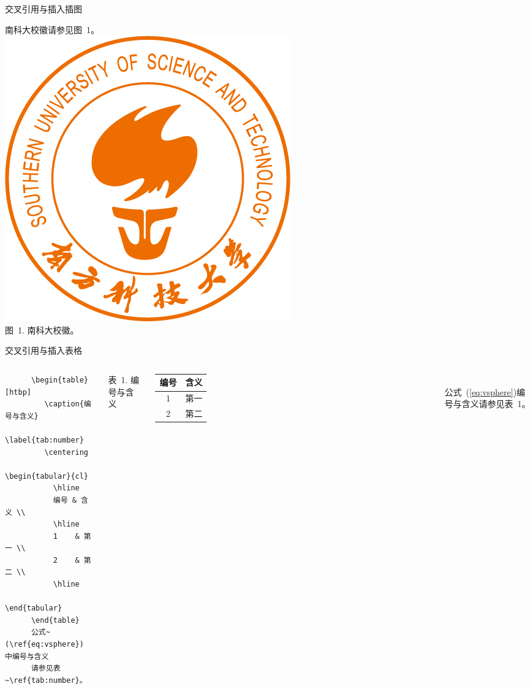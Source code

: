 \begin{frame}[fragile]{交叉引用与插入插图}
\begin{minipage}{0.3\linewidth}
          {\songti 南科大校徽请参见图~1。}\\[1em]
       \includegraphics[height=0.2\textheight]{LOGO.png}\\
       {\footnotesize\heiti 图~1. 南科大校徽。}
        \end{minipage}
      \end{frame}
      
      \begin{frame}[fragile]{交叉引用与插入表格}
        \begin{columns}
        \lstset{language=[LaTeX]TeX}
        \begin{lstlisting}
      \begin{table}[htbp]
         \caption{编号与含义}
         \label{tab:number}
         \centering
         \begin{tabular}{cl}
           \hline
           编号 & 含义 \\
           \hline
           1    & 第一 \\
           2    & 第二 \\
           \hline
         \end{tabular}
      \end{table}
      公式~(\ref{eq:vsphere}) 中编号与含义
      请参见表~\ref{tab:number}。
      \end{lstlisting}
      \centering
      {\small 表~1. 编号与含义}\\[2pt]
      \begin{tabular}{cl}\hline
      编号 & 含义 \\\hline
      1 & 第一\\
      2  & 第二\\\hline
      \end{tabular}\\[5pt]
      
      \normalsize 公式~(\ref{eq:vsphere})编号与含义请参见表~1。
        \end{columns}
      \end{frame}
      
